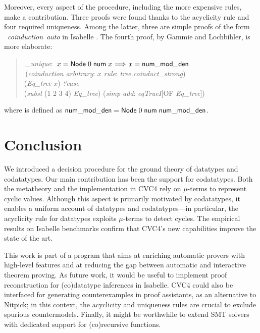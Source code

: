 Moreover, every aspect of the procedure, including the
more expensive rules, make a contribution.
%
Three proofs were found thanks to
the acyclicity rule and four required uniqueness. Among the latter,
three are simple proofs of the form
~\textit{coinduction}~\textit{auto}
in Isabelle \cite{blanchette-et-al-2014-impl}.
The fourth proof, by Gammie and Lochbihler, is more elaborate:
%
\begin{quote}
 \,\textit{\nummodden\_unique}: \,$x = \const{Node}\;0\;\const{num}\; x \vthinspace\Longrightarrow\vthinspace x = \const{\nummodden}$ \\
 \,(\textit{coinduction arbitrary}: $x$ \textit{rule}: \textit{tree.coinduct\_strong}) \\
\noindent\hbox{}\quad  {} (\textit{Eq\_tree} $x$)  \textit{?case} \\
\noindent\hbox{}\qquad  {} (\textit{subst} (1 2 3 4) \textit{Eq\_tree}) (\textit{simp add}: \textit{eqTrueI}[OF \textit{Eq\_tree}]) \\
\end{quote}
%
\noindent
where \const{\nummodden} is defined as $\textsf{num\hbox{\rm\_}mod\hbox{\rm\_}den} =
\textsf{Node}\;0\;\textsf{num}\;\textsf{num\hbox{\rm\_}mod\hbox{\rm\_}den}$.

\section{Conclusion}
\label{sec:conclusion}

We introduced a decision procedure for the ground theory of datatypes and
codatatypes. Our main
contribution has been the support for codatatypes. Both the metatheory and
the implementation in CVC4 rely on $\mu$-terms to represent cyclic values.
Although this aspect is primarily motivated by codatatypes, it enables
a uniform account of datatypes and codatatypes---in particular,
the acyclicity rule for datatypes exploits $\mu$-terms to detect cycles.
The empirical results on Isabelle benchmarks
confirm that CVC4's new capabilities improve the state of the art.

This work is part of a program that aims at enriching automatic provers
with high-level features and at reducing the gap between automatic and
interactive theorem proving. As future work, it would be useful to implement
proof reconstruction for (co)data\-type inferences in Isabelle.
CVC4 could also be interfaced for generating counterexamples in proof assistants, as
an alternative to Nitpick; in this context, the acyclicity and uniqueness
rules are crucial to exclude spurious countermodels. Finally, it might be
worthwhile to extend SMT solvers with dedicated support for (co)recursive
functions.

